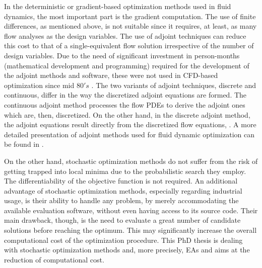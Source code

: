 In the deterministic or gradient-based optimization methods used in fluid dynamics, the most important part is the gradient computation. The use of finite differences, as mentioned above, is not suitable since it requires, at least, as many flow analyses as the design variables. The use of adjoint techniques can reduce this cost to that of a single-equivalent flow solution irrespective of the number of design variables. Due to the need of significant investment in person-months (mathematical development and programming) required for the development of the adjoint methods and software, these were not used in CFD-based optimization since mid $80's$ \cite{piron:84, kn:Jame88, kn:Jame94, kn:Jame95}.  The two variants of adjoint techniques, discrete and continuous, differ in the way the discretized adjoint equations are formed. The continuous adjoint method \cite{kn:Jame94, kn:Ander99,phd:papadim} processes the flow PDEs to derive the adjoint ones which are, then, discretized. On the other hand, in the discrete adjoint method, the adjoint equations result directly from the discretized flow equations, \cite{kn:Elliott96, anderson:99}. A more detailed presentation of adjoint methods used for fluid dynamic optimization can be found in \cite{phd:papadim}.        

On the other hand, stochastic optimization methods  do not suffer from the risk of getting trapped into local minima due to the probabilistic search they employ. The differentiability of the objective function is not required. An additional advantage of stochastic optimization methods, especially regarding industrial usage, is their ability to handle any problem, by merely accommodating the available evaluation software, without even having access to its source code. Their main drawback, though, is the need to evaluate a great number of candidate solutions before reaching the optimum. This may significantly increase the overall computational cost of the optimization procedure. This PhD thesis is dealing with stochastic optimization methods and, more precisely, EAs and aims at the reduction of computational cost. 

